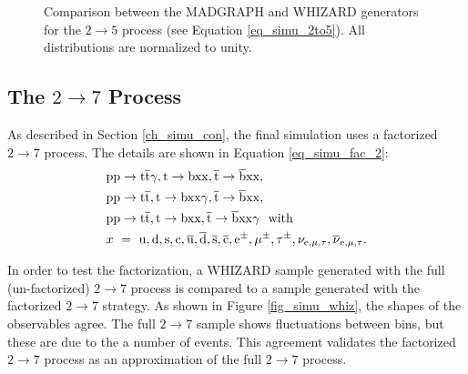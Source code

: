 \begin{figure}[ht]
\centering
  \caption{Comparison between the MADGRAPH and WHIZARD generators for the $2 \to 5$ process (see Equation \ref{eq_simu_2to5}). All distributions are normalized to unity.}
  \label{fig_simu_comp_2to5_1}
\end{figure}

\FloatBarrier
\subsection{The $2 \to 7$ Process}
\label{sec_simu_comp_2to7}

As described in Section \ref{ch_simu_con}, the final simulation uses a factorized $2 \to 7$ process. The details are shown in Equation \ref{eq_simu_fac_2}:\\

\begin{equation}
\begin{split}
& \mathrm{pp}\to \mathrm{t}\overline{\mathrm{t}} \gamma,  \mathrm{t} \to \mathrm{bxx},  \overline{\mathrm{t}} \to \overline{\mathrm{b}} \mathrm{xx}, \\
& \mathrm{pp}\to \mathrm{t} \overline{\mathrm{t}},  \mathrm{t} \to \mathrm{bxx} \gamma,  \overline{\mathrm{t}} \to \overline{\mathrm{b}} \mathrm{xx}, \\
& \mathrm{pp}\to \mathrm{t} \overline{\mathrm{t}},  \mathrm{t} \to \mathrm{bxx},  \overline{\mathrm{t}} \to \overline{\mathrm{b}} \mathrm{xx} \gamma ~~\mathrm{with}\\
&  x\ = \ \mathrm{u}, \mathrm{d}, \mathrm{s}, \mathrm{c}, \overline{\mathrm{u}}, \overline{\mathrm{d}},  \overline{\mathrm{s}},  \overline{\mathrm{c}}, \mathrm{e}^{\pm}, \mu^{\pm}, \tau^{\pm}, \nu_{\mathrm{e},\mu,\tau}, \overline{\nu}_{\mathrm{e},\mu,\tau} .\end{split}
\label{eq_simu_fac_2}
\end{equation}

In order to test the factorization, a WHIZARD sample generated with the full (un-factorized) $2 \to 7$ process is compared to a sample generated with the factorized $2 \to 7$ strategy. As shown in Figure \ref{fig_simu_whiz}, the shapes of the observables agree. The full $2 \to 7$ sample shows fluctuations between bins, but these are due to the a number of events. This agreement validates the factorized $2 \to 7$ process as an approximation of the full $2 \to 7$ process.\\

